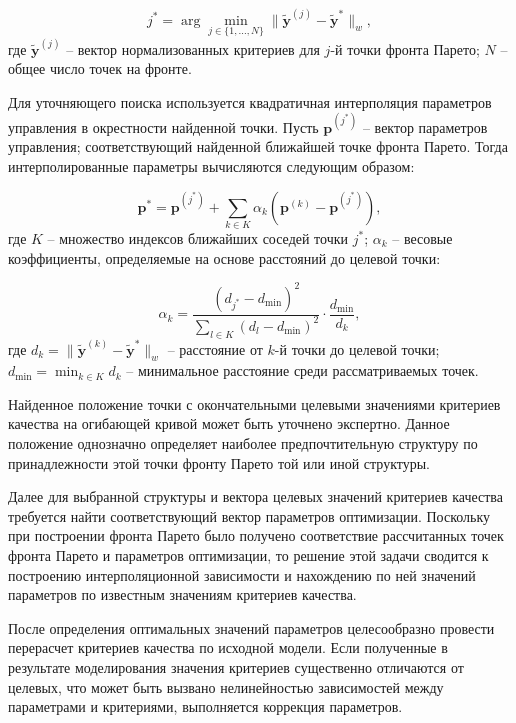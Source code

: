 \begin{equation}\label{eq:brute_force_search}
	j^* = \arg\min_{j \in \{1,\ldots,N\}} \|\mathbf{\tilde{y}}^{(j)} - \mathbf{\tilde{y}}^*\|_w,
\end{equation}
где $\mathbf{\tilde{y}}^{(j)}$ -- вектор нормализованных критериев для $j$-й точки фронта Парето;
$N$ -- общее число точек на фронте.

Для уточняющего поиска используется квадратичная интерполяция параметров управления в
окрестности найденной точки. Пусть $\mathbf{p}^{(j^*)}$ -- вектор параметров управления;
соответствующий найденной ближайшей точке фронта Парето.
Тогда интерполированные параметры вычисляются следующим образом:

\begin{equation}\label{eq:interpolation}
	\mathbf{p}^* = \mathbf{p}^{(j^*)} + \sum_{k \in K} \alpha_k (\mathbf{p}^{(k)} - \mathbf{p}^{(j^*)}),
\end{equation}
где $K$ -- множество индексов ближайших соседей точки $j^*$;
$\alpha_k$ -- весовые коэффициенты, определяемые на основе расстояний до целевой точки:

\begin{equation}\label{eq:interpolation_weights}
	\alpha_k = \frac{(d_{j^*} - d_{\min})^2}{\sum_{l \in K} (d_l - d_{\min})^2} \cdot \frac{d_{\min}}{d_k},
\end{equation}
где $d_k = \|\mathbf{\tilde{y}}^{(k)} - \mathbf{\tilde{y}}^*\|_w$ -- расстояние от $k$-й точки до целевой точки;
$d_{\min} = \min_{k \in K} d_k$ -- минимальное расстояние среди рассматриваемых точек.

Найденное положение точки с окончательными целевыми значениями
критериев качества на огибающей кривой может быть уточнено экспертно.
Данное положение однозначно определяет наиболее предпочтительную структуру
по принадлежности этой точки фронту Парето той или иной структуры. 

Далее для выбранной структуры и вектора целевых значений критериев качества
требуется найти соответствующий вектор параметров оптимизации. 
Поскольку при построении фронта Парето было получено соответствие
рассчитанных точек фронта Парето и параметров оптимизации, то решение
этой задачи сводится к построению интерполяционной зависимости и
нахождению по ней значений параметров по известным значениям критериев качества.

После определения оптимальных значений параметров целесообразно провести перерасчет
критериев качества по исходной модели. Если полученные в результате моделирования значения
критериев существенно отличаются от целевых, что может быть вызвано нелинейностью зависимостей
между параметрами и критериями, выполняется коррекция параметров.

